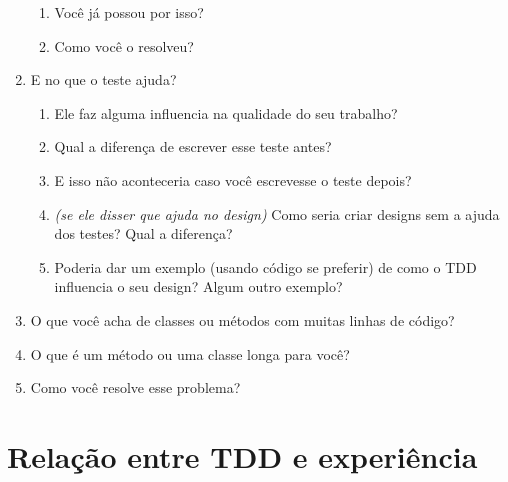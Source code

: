 \begin{enumerate}
		\begin{enumerate}
		  \item Você já possou por isso?

		  \item Como você o resolveu?
		\end{enumerate}

	\item E no que o teste ajuda?
	\begin{enumerate}
		\item Ele faz alguma influencia na qualidade do seu trabalho?

		\item Qual a diferença de escrever esse teste antes?

		\item E isso não aconteceria caso você escrevesse o teste depois?

		\item \textit{(se ele disser que ajuda no design)} Como seria criar designs
		sem a ajuda dos testes? Qual a diferença?

		\item Poderia dar um exemplo (usando código se preferir) de como o TDD
		influencia o seu design? Algum outro exemplo?

	\end{enumerate}

	\item O que você acha de classes ou métodos com muitas linhas de código?

	\item O que é um método ou uma classe longa para você?

	\item Como você resolve esse problema?

\end{enumerate}

\section{Relação entre TDD e experiência}

